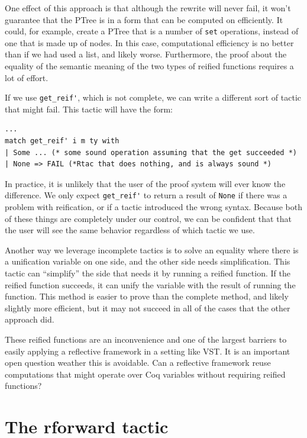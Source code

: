 \documentclass{puthesis}
\begin{document}
One effect of this approach is that although the rewrite will never
fail, it won't guarantee that the PTree is in a form that can be
computed on efficiently. It could, for example, create a PTree that is
a number of \lstinline|set| operations, instead of one that is made up
of nodes. In this case, computational efficiency is no better than if
we had used a list, and likely worse. Furthermore, the proof about the
equality of the semantic meaning of the two types of reified functions
requires a lot of effort.

If we use \lstinline|get_reif'|, which is not complete, we can write a
different sort of tactic that might fail. This tactic will have the
form:

\begin{lstlisting}
...
match get_reif' i m ty with
| Some ... (* some sound operation assuming that the get succeeded *)
| None => FAIL (*Rtac that does nothing, and is always sound *)
\end{lstlisting}

In practice, it is unlikely that the user of the proof system will
ever know the difference. We only expect \lstinline|get_reif'| to
return a result of \lstinline|None| if there was a problem with
reification, or if a tactic introduced the wrong syntax. Because both
of these things are completely under our control, we can be confident
that that the user will see the same behavior regardless of which
tactic we use.

Another way we leverage incomplete tactics is to solve an equality
where there is a unification variable on one side, and the other side
needs simplification. This tactic can ``simplify'' the side that needs
it by running a reified function. If the reified function succeeds, it
can unify the variable with the result of running the function. This
method is easier to prove than the complete method, and likely
slightly more efficient, but it may not succeed in all of the cases
that the other approach did.

These reified functions are an inconvenience and one of the largest
barriers to easily applying a reflective framework in a setting like
VST. It is an important open question weather this is avoidable. Can
a reflective framework reuse computations that might operate
over Coq variables without requiring reified functions? 

\section{The rforward tactic}
\end{document}
